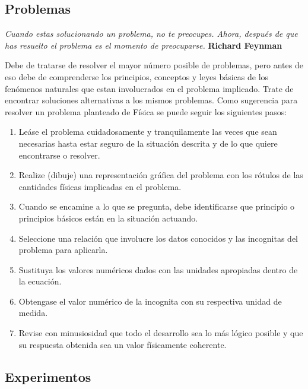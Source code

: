 \documentclass[a5paper,pagesize,10pt,bibtotoc,pointlessnumbers,
normalheadings,DIV=9,fleqn,x11names,table,twoside=false]{scrbook}
\begin{document}
\subsection*{Problemas}


\textit{Cuando estas solucionando un problema, no te preocupes. Ahora, después de que has resuelto el problema es el momento de 
preocuparse.} \textbf{Richard Feynman}
\vspace{1.0cm}

Debe de tratarse de resolver el mayor número posible de problemas, pero antes de eso debe de comprenderse los principios, 
conceptos y leyes básicas de los fenómenos naturales que estan involucrados en el problema implicado. Trate de encontrar 
soluciones alternativas a los mismos problemas. Como sugerencia para resolver un problema planteado de Física se puede seguir los 
siguientes pasos:\\

\begin{enumerate}
\item Leáse el problema cuidadosamente y tranquilamente las veces que sean necesarias hasta estar seguro de la situación descrita 
y de lo que quiere encontrarse o resolver.

\item Realize (dibuje) una representación gráfica del problema con los rótulos de las cantidades físicas implicadas en el 
problema.

\item Cuando se encamine a lo que se pregunta, debe identificarse que principio o principios básicos están en la situación 
actuando.

\item Seleccione una relación que involucre los datos conocidos y las incognitas del problema para aplicarla.

\item Sustituya los valores numéricos dados con las unidades apropiadas dentro de la ecuación.

\item Obtengase el valor numérico de la incognita con su respectiva unidad de medida.

\item Revise con minusiosidad que todo el desarrollo sea lo más lógico posible y que su respuesta obtenida sea un valor 
físicamente coherente.
 
\end{enumerate}

\subsection*{Experimentos}
\end{document}
